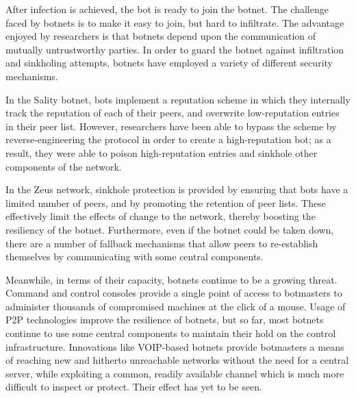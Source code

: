 \documentclass{acm_proc_article-sp}
\begin{document}
After infection is achieved, the bot is ready to join the botnet.  The challenge faced by botnets is to make it easy to join, but hard to infiltrate.  The advantage enjoyed by researchers is that botnets depend upon the communication of mutually untrustworthy parties\cite{stone:p2p}. In order to guard the botnet against infiltration and sinkholing attempts, botnets have employed a variety of different security mechanisms. 

In the Sality botnet, bots implement a reputation scheme in which they internally track the reputation of each of their peers, and overwrite low-reputation entries in their peer list.  However, researchers have been able to bypass the scheme by reverse-engineering the protocol in order to create a high-reputation bot; as a result, they were able to poison high-reputation entries and sinkhole other components of the network.

In the Zeus network, sinkhole protection is provided by ensuring that bots have a limited number of peers, and by promoting the retention of peer lists.  These effectively limit the effects of change to the network, thereby boosting the resiliency of the botnet.  Furthermore, even if the botnet could be taken down, there are a number of fallback mechanisms that allow peers to re-establish themselves by communicating with some central components.

Meanwhile, in terms of their capacity, botnets continue to be a growing threat.  Command and control consoles provide a single point of access to botmasters to administer thousands of compromised machines at the click of a mouse.  Usage of P2P technologies improve the resilience of botnets, but so far, most botnets continue to use some central components to maintain their hold on the control infrastructure. Innovations like VOIP-based botnets provide botmasters a means of reaching new and hitherto unreachable networks without the need for a central server, while exploiting a common, readily available channel which is much more difficult to inspect or protect\cite{defcon:voip}.  Their effect has yet to be seen.

\printbibliography{}
\end{document}
